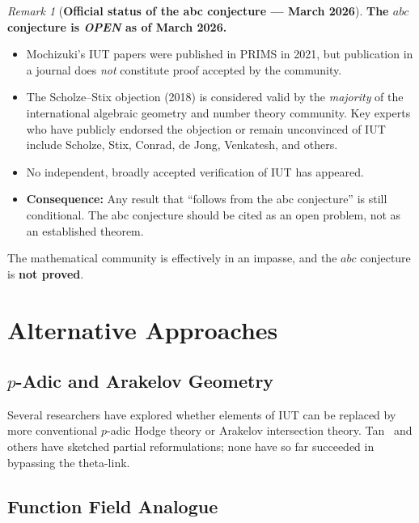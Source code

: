 \documentclass[12pt,a4paper]{article}
\theoremstyle{remark}
\newtheorem{remark}[theorem]{Remark}
\begin{document}
\begin{remark}[\textbf{Official status of the abc conjecture — March 2026}]
\textbf{The $abc$ conjecture is \emph{OPEN} as of March 2026.}
\begin{itemize}[nosep]
  \item Mochizuki's IUT papers were published in PRIMS in 2021, but publication in a
    journal does \emph{not} constitute proof accepted by the community.
  \item The Scholze--Stix objection (2018) is considered valid by the
    \emph{majority} of the international algebraic geometry and number theory community.
    Key experts who have publicly endorsed the objection or remain unconvinced of IUT
    include Scholze, Stix, Conrad, de Jong, Venkatesh, and others.
  \item No independent, broadly accepted verification of IUT has appeared.
  \item \textbf{Consequence:} Any result that ``follows from the abc conjecture'' is
    still conditional.  The abc conjecture should be cited as an open problem, not as
    an established theorem.
\end{itemize}
\end{remark}

The mathematical community is effectively in an impasse, and the $abc$ conjecture is
\textbf{not proved}.

\section{Alternative Approaches}

\subsection{$p$-Adic and Arakelov Geometry}

Several researchers have explored whether elements of IUT can be replaced by more
conventional $p$-adic Hodge theory or Arakelov intersection theory.  Tan~\cite{Tan2022}
and others have sketched partial reformulations; none have so far succeeded in bypassing
the theta-link.

\subsection{Function Field Analogue}
\end{document}
